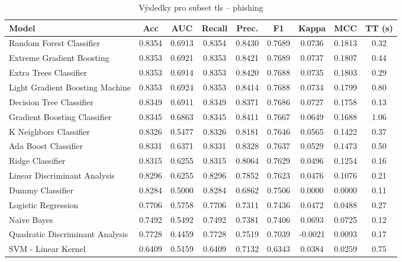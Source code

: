\begin{table}[H]
  \centering
  \small
  \caption{Výsledky pro subset tls – phishing}
  \begin{tabular}{|l|c|c|c|c|c|c|c|c|}
    \hline
    \textbf{Model} & \textbf{Acc} & \textbf{AUC} & \textbf{Recall} & \textbf{Prec.} & \textbf{F1} & \textbf{Kappa} & \textbf{MCC} & \textbf{TT (s)} \\
    \hline
    Random Forest Classifier & 0.8354 & 0.6913 & 0.8354 & 0.8430 & 0.7689 & 0.0736 & 0.1813 & 0.32 \\
    Extreme Gradient Boosting & 0.8353 & 0.6921 & 0.8353 & 0.8421 & 0.7689 & 0.0737 & 0.1807 & 0.44 \\
    Extra Trees Classifier & 0.8353 & 0.6914 & 0.8353 & 0.8420 & 0.7688 & 0.0735 & 0.1803 & 0.29 \\
    Light Gradient Boosting Machine & 0.8353 & 0.6924 & 0.8353 & 0.8414 & 0.7688 & 0.0734 & 0.1799 & 0.80 \\
    Decision Tree Classifier & 0.8349 & 0.6911 & 0.8349 & 0.8371 & 0.7686 & 0.0727 & 0.1758 & 0.13 \\
    Gradient Boosting Classifier & 0.8345 & 0.6863 & 0.8345 & 0.8411 & 0.7667 & 0.0649 & 0.1688 & 1.06 \\
    K Neighbors Classifier & 0.8326 & 0.5477 & 0.8326 & 0.8181 & 0.7646 & 0.0565 & 0.1422 & 0.37 \\
    Ada Boost Classifier & 0.8331 & 0.6371 & 0.8331 & 0.8328 & 0.7637 & 0.0529 & 0.1473 & 0.50 \\
    Ridge Classifier & 0.8315 & 0.6255 & 0.8315 & 0.8064 & 0.7629 & 0.0496 & 0.1254 & 0.16 \\
    Linear Discriminant Analysis & 0.8296 & 0.6255 & 0.8296 & 0.7852 & 0.7623 & 0.0476 & 0.1076 & 0.21 \\
    Dummy Classifier & 0.8284 & 0.5000 & 0.8284 & 0.6862 & 0.7506 & 0.0000 & 0.0000 & 0.11 \\
    Logistic Regression & 0.7706 & 0.5758 & 0.7706 & 0.7311 & 0.7436 & 0.0472 & 0.0488 & 0.27 \\
    Naive Bayes & 0.7492 & 0.5492 & 0.7492 & 0.7381 & 0.7406 & 0.0693 & 0.0725 & 0.12 \\
    Quadratic Discriminant Analysis & 0.7728 & 0.4459 & 0.7728 & 0.7519 & 0.7039 & -0.0021 & 0.0093 & 0.17 \\
    SVM - Linear Kernel & 0.6409 & 0.5159 & 0.6409 & 0.7132 & 0.6343 & 0.0384 & 0.0259 & 0.75 \\
    \hline
  \end{tabular}
\end{table}
\vspace{0.5cm}
